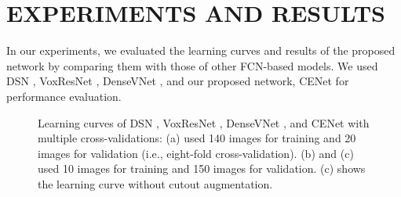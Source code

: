 \documentclass[journal]{IEEEtran}
\begin{document}
\section{EXPERIMENTS AND RESULTS}

In our experiments, we evaluated the learning curves and results of the proposed network by comparing them with those of other FCN-based models. We used DSN \cite{dou20173d}, VoxResNet \cite{chen2017voxresnet}, DenseVNet \cite{gibson2018automatic}, and our proposed network, CENet for performance evaluation.

\begin{figure}[t]%
    \centering
    \vfil
    \centering
    \vfil
    \centering
    \vfil
    \caption{Learning curves of DSN \cite{dou20173d}, VoxResNet \cite{chen2017voxresnet}, DenseVNet \cite{gibson2018automatic}, and CENet with multiple cross-validations: (a) used 140 images for training and 20 images for validation (i.e., eight-fold cross-validation). (b) and (c) used 10 images for training and 150 images for validation. (c) shows the learning curve without cutout \cite{devries2017improved} augmentation.}
    \label{fig:learningcurve}
\end{figure}
\end{document}

